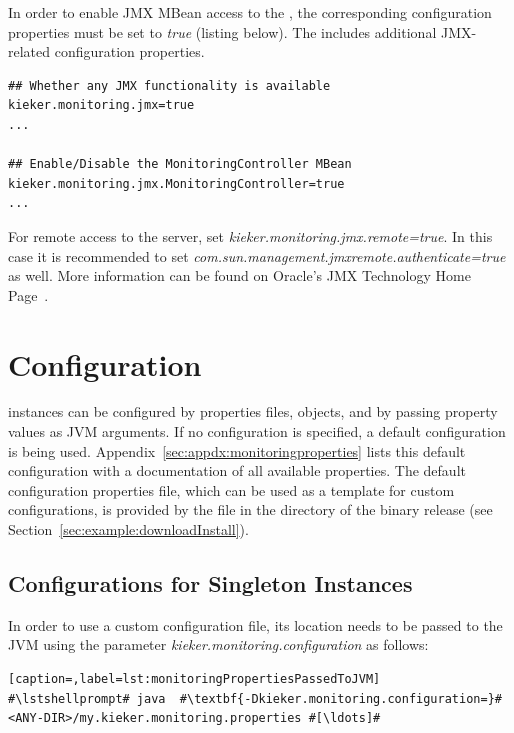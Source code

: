 In order to enable JMX MBean access to the , the corresponding configuration properties must be set to \textit{true} (listing below). %
The \file{\monitoringPropertiesFile} includes additional JMX-related configuration properties. \\

\setPropertiesListing
\begin{lstlisting}
## Whether any JMX functionality is available
kieker.monitoring.jmx=true
...

## Enable/Disable the MonitoringController MBean
kieker.monitoring.jmx.MonitoringController=true
...
\end{lstlisting}

For remote access to the server, set \textit{kieker.monitoring.jmx.remote=true}. In this case it is recommended to set \textit{com.sun.management.jmxremote.authenticate=true} as well. More information can be found on Oracle's JMX Technology Home Page~\cite{JMX-Website}.


\section{\KiekerMonitoringPart{} Configuration}\label{sec:monitoring:configuration}

\KiekerMonitoringPart{} instances can be configured by properties files, %
 objects, and by passing property values as %
JVM arguments. If no configuration is specified, a default %
configuration is being used. %
Appendix~\ref{sec:appdx:monitoringproperties} lists this default %
configuration with a documentation of all available properties. %
The default configuration properties file, which %
can be used as a template for custom configurations, is provided by the file %
\file{\kiekerExampleMonitoringProperties} in the directory  of %
the binary release (see Section~\ref{sec:example:downloadInstall}). %


\subsection*{Configurations for Singleton Instances}

In order to use a custom configuration file, its location needs to be passed to %
the JVM using the parameter \textit{kieker.monitoring.configuration} as follows:

\setBashListing
\begin{lstlisting}[caption=,label=lst:monitoringPropertiesPassedToJVM]
#\lstshellprompt# java  #\textbf{-Dkieker.monitoring.configuration=}#<ANY-DIR>/my.kieker.monitoring.properties #[\ldots]#
\end{lstlisting}

